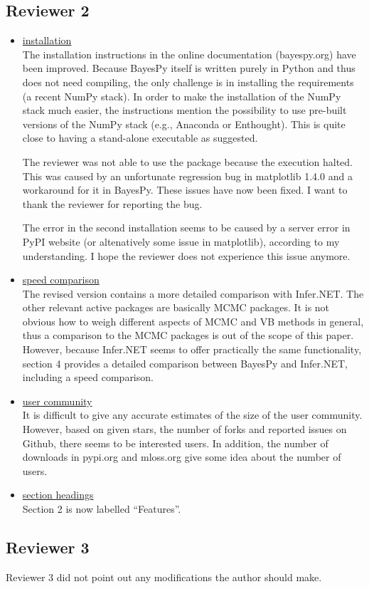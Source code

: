 \documentclass{article}
\begin{document}
\subsection{Reviewer 2}

\begin{itemize}

\item \underline{installation}
  \\
  The installation instructions in the online documentation (bayespy.org) have
  been improved.  Because BayesPy itself is written purely in Python and thus
  does not need compiling, the only challenge is in installing the requirements
  (a recent NumPy stack).  In order to make the installation of the NumPy stack
  much easier, the instructions mention the possibility to use pre-built
  versions of the NumPy stack (e.g., Anaconda or Enthought).  This is quite
  close to having a stand-alone executable as suggested.

  The reviewer was not able to use the package because the execution halted.
  This was caused by an unfortunate regression bug in matplotlib 1.4.0 and a
  workaround for it in BayesPy.  These issues have now been fixed.  I want to
  thank the reviewer for reporting the bug.

  The error in the second installation seems to be caused by a server error in
  PyPI website (or altenatively some issue in matplotlib), according to my
  understanding.  I hope the reviewer does not experience this issue anymore.

\item \underline{speed comparison}
  \\
  The revised version contains a more detailed comparison with Infer.NET.  The
  other relevant active packages are basically MCMC packages.  It is not obvious
  how to weigh different aspects of MCMC and VB methods in general, thus a
  comparison to the MCMC packages is out of the scope of this paper.  However,
  because Infer.NET seems to offer practically the same functionality, section 4
  provides a detailed comparison between BayesPy and Infer.NET, including a
  speed comparison.

\item \underline{user community}
  \\
  It is difficult to give any accurate estimates of the size of the user
  community.  However, based on given stars, the number of forks and reported
  issues on Github, there seems to be interested users.  In addition, the number
  of downloads in pypi.org and mloss.org give some idea about the number of
  users.

\item \underline{section headings}
  \\
  Section 2 is now labelled ``Features''.

\end{itemize}

\subsection{Reviewer 3}

Reviewer 3 did not point out any modifications the author should make.
\end{document}
